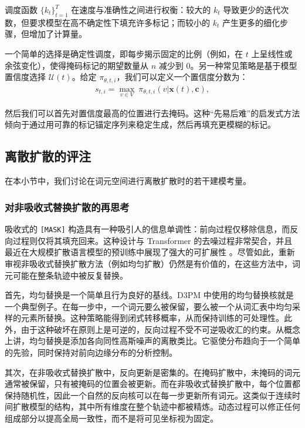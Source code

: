 \noindent 调度函数 $\{k_t\}_{t=1}^T$ 在速度与准确性之间进行权衡：较大的 $k_t$ 导致更少的迭代次数，但要求模型在高不确定性下填充许多标记；而较小的 $k_t$ 产生更多的细化步骤，但增加了计算量。

一个简单的选择是确定性调度，即每步揭示固定的比例（例如，在 $t$ 上呈线性或余弦变化），使得掩码标记的期望数量从 $n$ 减少到 $0$。另一种常见策略是基于模型置信度选择 $\mathcal{U}(t)$。给定 $\pi_{\theta,t,i}$，我们可以定义一个置信度分数为：
\begin{eqnarray}
s_{t,i} = \max_{v\in V}\ \pi_{\theta,t,i}\!\left(v| \mathbf{x}(t),\mathbf{c}\right),
\end{eqnarray}

\noindent 然后我们可以首先对置信度最高的位置进行去掩码。这种“先易后难”的启发式方法倾向于通过用可靠的标记锚定序列来稳定生成，然后再填充更模糊的标记。
\subsection{离散扩散的评注}

在本小节中，我们讨论在词元空间进行离散扩散时的若干建模考量。

\subsubsection{对非吸收式替换扩散的再思考}
\label{sec:rethink-non-absorbing}

吸收式的 \texttt{[MASK]} 构造具有一种吸引人的信息单调性：前向过程仅移除信息，而反向过程则仅将其填充回来。这种设计与 Transformer 的去噪过程非常契合，并且最近在大规模扩散语言模型的预训练中展现了强大的可扩展性 \citep{sahoo-etal:2024simple,nie-etal:2025large}。尽管如此，重新审视非吸收式替换扩散方法（例如均匀扩散）仍然是有价值的，在这些方法中，词元可能在整条轨迹中被反复替换。

首先，均匀替换是一个简单且行为良好的基线。D3PM 中使用的均匀替换核就是一个典型例子。在每一步中，一个词元要么被保留，要么被一个从词汇表中均匀采样的元素所替换。这种策略能得到闭式转移概率，从而保持训练的可处理性。此外，由于这种破坏在原则上是可逆的，反向过程不受不可逆吸收汇的约束。从概念上讲，均匀替换是添加各向同性高斯噪声的离散类比。它驱使分布趋向于一个简单的先验，同时保持对前向边缘分布的分析控制。

其次，在非吸收式替换扩散中，反向更新是密集的。在掩码扩散中，未掩码的词元通常被保留，只有被掩码的位置会被更新。而在非吸收式替换扩散中，每个位置都保持随机性，因此一个自然的反向核可以在每一步更新所有词元。这类似于连续时间扩散模型的结构，其中所有维度在整个轨迹中都被精炼。动态过程可以修正任何组成部分以提高全局一致性，而不是将可见坐标视为固定。

